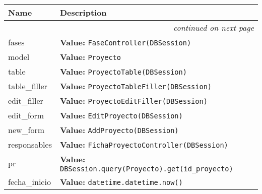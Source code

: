     \vspace{-1cm}
\hspace{\varindent}\begin{longtable}{|p{\varnamewidth}|p{\vardescrwidth}|l}
\cline{1-2}
\cline{1-2} \centering \textbf{Name} & \centering \textbf{Description}& \\
\cline{1-2}
\endhead\cline{1-2}\multicolumn{3}{r}{\small\textit{continued on next page}}\\\endfoot\cline{1-2}
\endlastfoot\raggedright f\-a\-s\-e\-s\- & \raggedright \textbf{Value:} 
{\tt FaseController(DBSession)}&\\
\cline{1-2}
\raggedright m\-o\-d\-e\-l\- & \raggedright \textbf{Value:} 
{\tt Proyecto}&\\
\cline{1-2}
\raggedright t\-a\-b\-l\-e\- & \raggedright \textbf{Value:} 
{\tt ProyectoTable(DBSession)}&\\
\cline{1-2}
\raggedright t\-a\-b\-l\-e\-\_\-f\-i\-l\-l\-e\-r\- & \raggedright \textbf{Value:} 
{\tt ProyectoTableFiller(DBSession)}&\\
\cline{1-2}
\raggedright e\-d\-i\-t\-\_\-f\-i\-l\-l\-e\-r\- & \raggedright \textbf{Value:} 
{\tt ProyectoEditFiller(DBSession)}&\\
\cline{1-2}
\raggedright e\-d\-i\-t\-\_\-f\-o\-r\-m\- & \raggedright \textbf{Value:} 
{\tt EditProyecto(DBSession)}&\\
\cline{1-2}
\raggedright n\-e\-w\-\_\-f\-o\-r\-m\- & \raggedright \textbf{Value:} 
{\tt AddProyecto(DBSession)}&\\
\cline{1-2}
\raggedright r\-e\-s\-p\-o\-n\-s\-a\-b\-l\-e\-s\- & \raggedright \textbf{Value:} 
{\tt FichaProyectoController(DBSession)}&\\
\cline{1-2}
\raggedright p\-r\- & \raggedright \textbf{Value:} 
{\tt DBSession.query(Proyecto).get(id\_proyecto)}&\\
\cline{1-2}
\raggedright f\-e\-c\-h\-a\-\_\-i\-n\-i\-c\-i\-o\- & \raggedright \textbf{Value:} 
{\tt datetime.datetime.now()}&\\
\cline{1-2}
\end{longtable}

